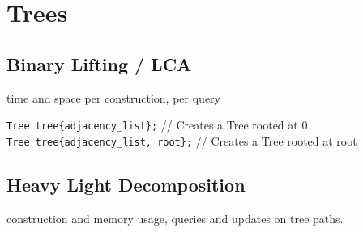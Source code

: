 \section{Trees}

\subsection{Binary Lifting / LCA}
 time and space per construction,  per query

\verb|Tree tree{adjacency_list};| // Creates a Tree rooted at 0 \\
\verb|Tree tree{adjacency_list, root};| // Creates a Tree rooted at root


\subsection{Heavy Light Decomposition}
 construction and memory usage,  queries and updates on tree paths.

